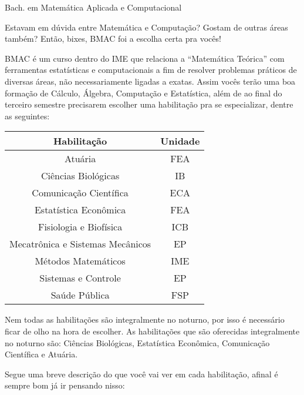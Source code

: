 \begin{subsecao}{Bach. em Matemática Aplicada e Computacional}

Estavam em dúvida entre Matemática e Computação? Gostam de outras áreas também?
Então, bixes, BMAC foi a escolha certa pra vocês!

BMAC é um curso dentro do IME que relaciona a ``Matemática Teórica'' com
ferramentas estatísticas e computacionais a fim de resolver problemas práticos
de diversas áreas, não necessariamente ligadas a exatas. Assim vocês terão uma
boa formação de Cálculo, Álgebra, Computação e Estatística, além de ao final do
terceiro semestre precisarem escolher uma habilitação pra se especializar, dentre as seguintes:

\begin {center}
  \begin {tabular}{|c|c|}
    \hline
    Habilitação & Unidade \\
    \hline
    Atuária & FEA\\
    Ciências Biológicas & IB\\
    Comunicação Científica & ECA\\
    Estatística Econômica & FEA\\
    Fisiologia e Biofísica & ICB\\
    Mecatrônica e Sistemas Mecânicos & EP\\
    Métodos Matemáticos & IME\\
    Sistemas e Controle & EP\\
    Saúde Pública & FSP\\
    \hline
  \end {tabular}
\end {center}

Nem todas as habilitações são integralmente no noturno, por isso é necessário ficar de olho na hora de escolher. As habilitações que são oferecidas integralmente no noturno são: Ciências Biológicas, Estatística Econômica, Comunicação Científica e Atuária. 

Segue uma breve descrição do que você vai ver em cada habilitação, afinal é sempre bom já ir pensando nisso:


\end{subsecao}
